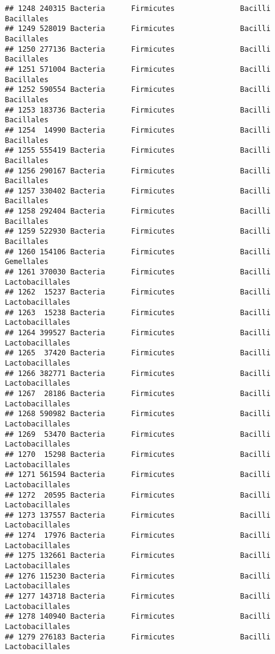 \documentclass[
]{article}
\begin{document}
\begin{verbatim}
## 1248 240315 Bacteria      Firmicutes               Bacilli          Bacillales
## 1249 528019 Bacteria      Firmicutes               Bacilli          Bacillales
## 1250 277136 Bacteria      Firmicutes               Bacilli          Bacillales
## 1251 571004 Bacteria      Firmicutes               Bacilli          Bacillales
## 1252 590554 Bacteria      Firmicutes               Bacilli          Bacillales
## 1253 183736 Bacteria      Firmicutes               Bacilli          Bacillales
## 1254  14990 Bacteria      Firmicutes               Bacilli          Bacillales
## 1255 555419 Bacteria      Firmicutes               Bacilli          Bacillales
## 1256 290167 Bacteria      Firmicutes               Bacilli          Bacillales
## 1257 330402 Bacteria      Firmicutes               Bacilli          Bacillales
## 1258 292404 Bacteria      Firmicutes               Bacilli          Bacillales
## 1259 522930 Bacteria      Firmicutes               Bacilli          Bacillales
## 1260 154106 Bacteria      Firmicutes               Bacilli          Gemellales
## 1261 370030 Bacteria      Firmicutes               Bacilli     Lactobacillales
## 1262  15237 Bacteria      Firmicutes               Bacilli     Lactobacillales
## 1263  15238 Bacteria      Firmicutes               Bacilli     Lactobacillales
## 1264 399527 Bacteria      Firmicutes               Bacilli     Lactobacillales
## 1265  37420 Bacteria      Firmicutes               Bacilli     Lactobacillales
## 1266 382771 Bacteria      Firmicutes               Bacilli     Lactobacillales
## 1267  28186 Bacteria      Firmicutes               Bacilli     Lactobacillales
## 1268 590982 Bacteria      Firmicutes               Bacilli     Lactobacillales
## 1269  53470 Bacteria      Firmicutes               Bacilli     Lactobacillales
## 1270  15298 Bacteria      Firmicutes               Bacilli     Lactobacillales
## 1271 561594 Bacteria      Firmicutes               Bacilli     Lactobacillales
## 1272  20595 Bacteria      Firmicutes               Bacilli     Lactobacillales
## 1273 137557 Bacteria      Firmicutes               Bacilli     Lactobacillales
## 1274  17976 Bacteria      Firmicutes               Bacilli     Lactobacillales
## 1275 132661 Bacteria      Firmicutes               Bacilli     Lactobacillales
## 1276 115230 Bacteria      Firmicutes               Bacilli     Lactobacillales
## 1277 143718 Bacteria      Firmicutes               Bacilli     Lactobacillales
## 1278 140940 Bacteria      Firmicutes               Bacilli     Lactobacillales
## 1279 276183 Bacteria      Firmicutes               Bacilli     Lactobacillales

\end{verbatim}
\end{document}
